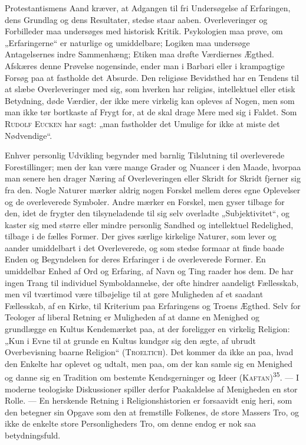 \documentclass[12pt,a4paper,openany]{book}
\newcommand{\opage}[1]{\marginnote{\footnotesize\textit{[#1]}}}
\begin{document}
Protestantismens Aand kræver, at Adgangen til fri Undersøgelse af
Erfaringen, dens Grundlag og dens Resultater, stedse staar aaben.
Overleveringer og Forbilleder maa undersøges med historisk Kritik.
Psykologien maa prøve, om „Erfaringerne“ er naturlige og umiddelbare;
Logiken maa undersøge Antagelsernes indre Sammenhæng; Etiken maa drøfte
Værdiernes Ægthed. Afskæres denne Prøvelse nogensinde, ender man i
Barbari eller i krampagtige Forsøg paa at fastholde det Absurde. Den
religiøse Bevidsthed har en Tendens til at slæbe Overleveringer med sig,
som hverken har religiøs, intellektuel eller etisk Betydning, døde
Værdier, der ikke mere virkelig kan opleves af Nogen, men som man ikke
tør bortkaste af Frygt for, at de skal drage Mere med sig i Faldet. Som
\textsc{Rudolf Eucken} har sagt: „man fastholder det Umulige for ikke at
miste det Nødvendige“.

Enhver personlig Udvikling begynder med barnlig Tilslutning til
overleverede Forestillinger; men der kan være mange Grader og Nuancer i
den Maade, hvorpaa man senere hen drager Næring af Overleveringen eller
Skridt for Skridt fjerner sig fra den. Nogle Naturer mærker aldrig nogen
Forskel mellem deres egne Oplevelser og de overleverede Symboler. Andre
mærker en Forskel, men gyser tilbage for den, idet de frygter den
tilsyneladende til sig selv overladte „Subjektivitet“, og kaster sig med
større eller mindre personlig Sandhed og intellektuel Redelighed,
tilbage i de fælles Former. Der gives særlige kirkelige Naturer, som
lever og aander umiddelbart i det Overleverede, og som stedse formaar at
finde baade Enden og Begyndelsen for deres Erfaringer i de overleverede
Former. En umiddelbar Enhed af Ord og Erfaring, af Navn og Ting raader
hos dem. De har ingen Trang til individuel Symboldannelse, der ofte
hindrer aandeligt Fællesskab, men vil tværtimod være tilbøjelige til at
gøre Muligheden af et saadant Fællesskab, af en Kirke, til Kriterium paa
\opage{81}Erfaringens og Troens Ægthed. Selv for Teologer af liberal
Retning er Muligheden af at danne en Menighed og grundlægge en Kultus
Kendemærket paa, at der foreligger en virkelig Religion: „Kun i Evne til
at grunde en Kultus kundgør sig den ægte, af ubrudt Overbevisning baarne
Religion“ \textsc{(Troeltich).} Det kommer da ikke an paa, hvad den
Enkelte har oplevet og udtalt, men paa, om der kan samle sig en Menighed
og danne sig en Tradition om bestemte Kendsgerninger og Ideer
\textsc{(Kaftan)}\textsuperscript{35}. --- I moderne teologiske
Diskussioner spiller derfor Paakaldelse af Menigheden en stor Rolle. ---
En herskende Retning i Religionshistorien er forsaavidt enig heri, som
den betegner sin Opgave som den at fremstille Folkenes, de store Massers
Tro, og ikke de enkelte store Personligheders Tro, om denne endog er nok
saa betydningsfuld.
\end{document}
